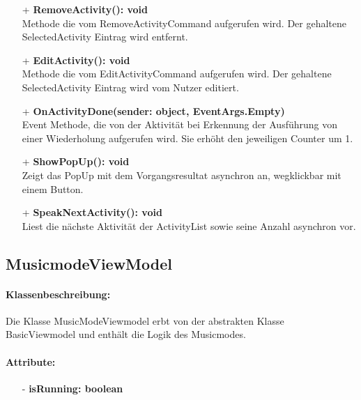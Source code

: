 \documentclass[a4paper,12pt]{article}
\begin{document}
\begin{itemize}
	\item[+] \textbf{RemoveActivity(): void} \\  Methode die vom RemoveActivityCommand aufgerufen wird. Der gehaltene SelectedActivity Eintrag wird entfernt. 
	\item[+] \textbf{EditActivity(): void} \\ Methode die vom EditActivityCommand aufgerufen wird. Der gehaltene SelectedActivity Eintrag wird vom Nutzer editiert.
	\item[+] \textbf{ OnActivityDone(sender: object, EventArgs.Empty)} \\ Event Methode, die von der Aktivität bei Erkennung der Ausführung von einer Wiederholung aufgerufen wird. Sie erhöht den jeweiligen Counter um 1.  
	\item[+] \textbf{ShowPopUp(): void} \\ Zeigt das PopUp mit dem Vorgangsresultat asynchron an, wegklickbar mit einem Button. 
	\item[+] \textbf{SpeakNextActivity(): void} \\ Liest die nächste Aktivität der ActivityList sowie seine Anzahl asynchron vor. 
\end{itemize}

\subsection{MusicmodeViewModel}
\paragraph{Klassenbeschreibung:}
Die Klasse MusicModeViewmodel erbt von der abstrakten Klasse BasicViewmodel und enthält die Logik des Musicmodes.
\paragraph{Attribute:}
\begin{itemize}
	\item[-] \textbf{isRunning: boolean}
\end{itemize}
\end{document}
